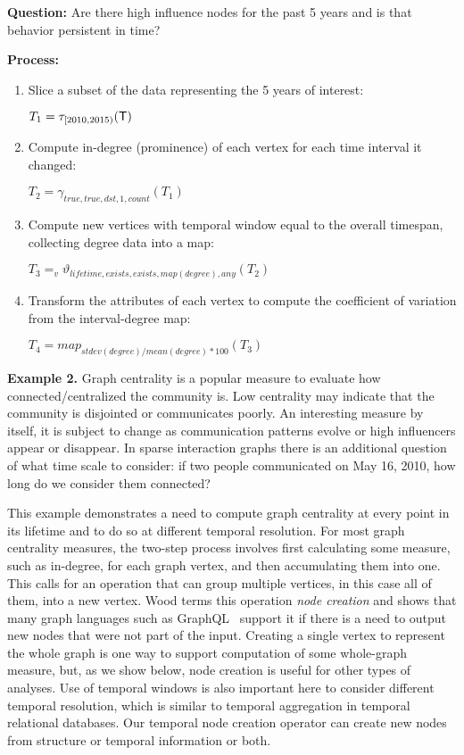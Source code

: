 {\bf Question:} Are there high influence nodes for the past 5 years
and is that behavior persistent in time?

{\bf Process:}
\begin{enumerate}[noitemsep]
\item Slice a subset of the data representing the 5 years of interest:

$T_1 = \tau_{[2010,2015)}( \mathsf{T})$

\item Compute in-degree (prominence) of each vertex for each time
interval it changed:

$T_2 = \gamma_{true,true,dst,1,count}(T_1)$

\item Compute new vertices with temporal window equal to the overall
  timespan, collecting degree data into a map:

$T_3 = _v\vartheta_{lifetime,exists,exists,map(degree),any}(T_2)$

\item Transform the attributes of each vertex to compute the
  coefficient of variation from the interval-degree map:

$T_4 = map_{stdev(degree)/mean(degree)*100}(T_3)$

\end{enumerate}

{\bf Example 2.}  Graph centrality is a popular measure to evaluate
how connected/centralized the community is.  Low centrality may
indicate that the community is disjointed or communicates poorly.  An
interesting measure by itself, it is subject to change as
communication patterns evolve or high influencers appear or disappear.
In sparse interaction graphs there is an additional question of what
time scale to consider: if two people communicated on May 16, 2010,
how long do we consider them connected?

This example demonstrates a need to compute graph centrality at every
point in its lifetime and to do so at different temporal resolution.
For most graph centrality measures, the two-step process involves
first calculating some measure, such as in-degree, for each graph
vertex, and then accumulating them into one.  This calls for an
operation that can group multiple vertices, in this case all of them,
into a new vertex.  Wood terms this operation {\em node creation} and
shows that many graph languages such as GraphQL~\cite{He2008} support
it if there is a need to output new nodes that were not part of the
input.  Creating a single vertex to represent the whole graph is one
way to support computation of some whole-graph measure, but, as we
show below, node creation is useful for other types of analyses.  Use
of temporal windows is also important here to consider different
temporal resolution, which is similar to temporal aggregation in
temporal relational databases.  Our temporal node creation operator
can create new nodes from structure or temporal information or both.

